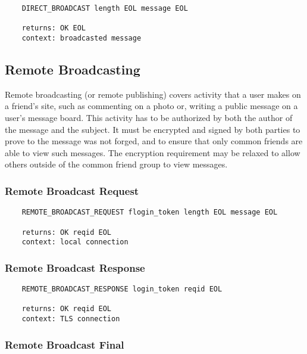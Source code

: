 \documentclass[letterpaper,11pt,oneside]{article}
\begin{document}
\vspace{10pt}
\begin{verbatim}
    DIRECT_BROADCAST length EOL message EOL

    returns: OK EOL
    context: broadcasted message
\end{verbatim}

\subsection{Remote Broadcasting}

Remote broadcasting (or remote publishing) covers activity that a user makes on
a friend's site, such as commenting on a photo or, writing a public message on
a user's message board. This activity has to be authorized by both the author
of the message and the subject. It must be encrypted and signed by both parties
to prove to the message was not forged, and to ensure that only common friends
are able to view such messages. The encryption requirement may be relaxed to
allow others outside of the common friend group to view messages.

\subsubsection{Remote Broadcast Request}

\vspace{10pt}
\begin{verbatim}
    REMOTE_BROADCAST_REQUEST flogin_token length EOL message EOL

    returns: OK reqid EOL
    context: local connection
\end{verbatim}
\vspace{10pt}

\subsubsection{Remote Broadcast Response}

\vspace{10pt}
\begin{verbatim}
    REMOTE_BROADCAST_RESPONSE login_token reqid EOL 

    returns: OK reqid EOL
    context: TLS connection
\end{verbatim}
\vspace{10pt}

\subsubsection{Remote Broadcast Final}
\end{document}
